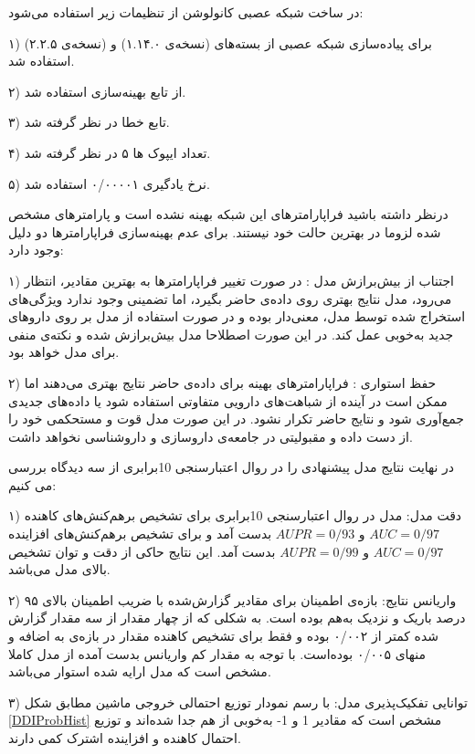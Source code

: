 \newpage
در ساخت شبکه عصبی کانولوشن از تنظیمات زیر استفاده می‌شود:

۱) برای پیاده‌سازی شبکه عصبی از بسته‌های
\cite{TENSORFLOW114}
(نسخه‌ی ۱.۱۴.۰) و
\cite{KERAS2020}
(نسخه‌ی ۲.۲.۵) استفاده شد.

۲) از تابع بهینه‌سازی
استفاده شد.
 
۳) تابع خطا
در نظر گرفته شد.

۴) تعداد ایپوک
ها ۵ در نظر گرفته شد. 

۵) نرخ یادگیری
۰/۰۰۰۰۱ استفاده شد.

درنظر داشته‌ باشید فراپارامترهای
این شبکه بهینه نشده ‌است و پارامترهای مشخص ‌شده لزوما در بهترین حالت خود نیستند. برای عدم بهینه‌سازی فراپارامترها دو دلیل وجود دارد:

۱) اجتناب از بیش‌برازش مدل
:
در صورت تغییر فراپارامترها به بهترین مقادیر، انتظار می‌رود، مدل نتایج بهتری روی داده‌ی حاضر بگیرد، اما تضمینی وجود ندارد ویژگی‌های استخراج شده توسط مدل، معنی‌دار بوده و در صورت استفاده از مدل بر روی داروهای جدید به‌خوبی عمل کند. در این صورت اصطلاحا مدل بیش‌برازش شده و نکته‌ی منفی برای مدل خواهد بود. 

۲) حفظ استواری
:
فراپارامترهای بهینه برای داده‌ی حاضر نتایج بهتری می‌دهند اما ممکن است در آینده از شباهت‌های دارویی متفاوتی استفاده شود یا داده‌های جدیدی جمع‌آوری شود و نتایج حاضر تکرار نشود. در این صورت مدل قوت و مستحکمی خود را از دست داده و مقبولیتی در جامعه‌ی داروسازی و داروشناسی نخواهد داشت.
 
 در نهایت نتایج مدل پیشنهادی را در روال اعتبارسنجی 10برابری از سه دیدگاه بررسی می کنیم:
 
 ۱) دقت مدل: مدل در روال اعتبارسنجی 10برابری برای تشخیص برهم‌کنش‌های کاهنده
$AUC=0/97$
و
$AUPR=0/93$ 
بدست آمد و برای تشخیص برهم‌کنش‌های افزاینده
$AUC=0/97$
و
$AUPR=0/99$
بدست آمد. این نتایج حاکی از دقت و توان تشخیص بالای مدل می‌باشد.
 
 ۲) واریانس نتایج: بازه‌ی اطمینان برای مقادیر گزارش‌شده با ضریب اطمینان بالای ۹۵ درصد باریک و نزدیک به‌هم بوده است. به شکلی که از چهار مقدار از سه مقدار گزارش شده کمتر از ۰/۰۰۲ بوده و  فقط برای تشخیص کاهنده مقدار 
 در بازه‌ی به اضافه و منهای ۰/۰۰۵ بوده‌است. با توجه به مقدار کم واریانس بدست آمده از مدل کاملا مشخص است که مدل ارایه شده استوار می‌باشد.
 

۳) توانایی تفکیک‌پذیری مدل: با رسم نمودار توزیع احتمالی خروجی ماشین مطابق شکل 
\ref{DDIProbHist}
 مشخص است که مقادیر 1 و 1- به‌خوبی از هم جدا شده‌اند و توزیع احتمال کاهنده و افزاینده اشترک کمی دارند. 


